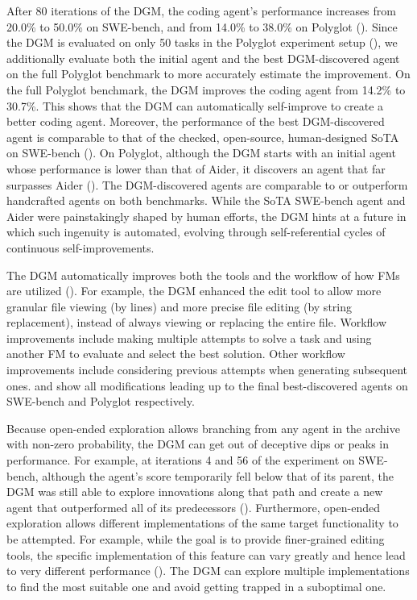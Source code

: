\documentclass{article}
\begin{document}
After 80 iterations of the DGM, the coding agent's performance increases from 20.0\% to 50.0\% on SWE-bench, and from 14.0\% to 38.0\% on Polyglot (). Since the DGM is evaluated on only 50 tasks in the Polyglot experiment setup (), we additionally evaluate both the initial agent and the best DGM-discovered agent on the full Polyglot benchmark to more accurately estimate the improvement. On the full Polyglot benchmark, the DGM improves the coding agent from 14.2\% to 30.7\%. This shows that the DGM can automatically self-improve to create a better coding agent. Moreover, the performance of the best DGM-discovered agent is comparable to that of the checked, open-source, human-designed SoTA on SWE-bench (). On Polyglot, although the DGM starts with an initial agent whose performance is lower than that of Aider, it discovers an agent that far surpasses Aider (). The DGM-discovered agents are comparable to or outperform handcrafted agents on both benchmarks. While the SoTA SWE-bench agent and Aider were painstakingly shaped by human efforts, the DGM hints at a future in which such ingenuity is automated, evolving through self-referential cycles of continuous self-improvements.

The DGM automatically improves both the tools and the workflow of how FMs are utilized (). For example, the DGM enhanced the edit tool to allow more granular file viewing (by lines) and more precise file editing (by string replacement), instead of always viewing or replacing the entire file. Workflow improvements include making multiple attempts to solve a task and using another FM to evaluate and select the best solution. Other workflow improvements include considering previous attempts when generating subsequent ones.  and  show all modifications leading up to the final best-discovered agents on SWE-bench and Polyglot respectively. 

Because open-ended exploration allows branching from any agent in the archive with non-zero probability, the DGM can get out of deceptive dips or peaks in performance. For example, at iterations 4 and 56 of the experiment on SWE-bench, although the agent's score temporarily fell below that of its parent, the DGM was still able to explore innovations along that path and create a new agent that outperformed all of its predecessors (). Furthermore, open-ended exploration allows different implementations of the same target functionality to be attempted. For example, while the goal is to provide finer‑grained editing tools, the specific implementation of this feature can vary greatly and hence lead to very different performance (). The DGM can explore multiple implementations to find the most suitable one and avoid getting trapped in a suboptimal one.
\end{document}
